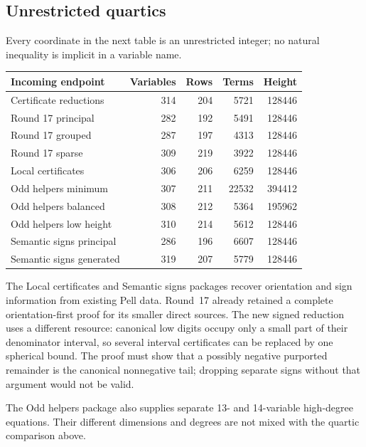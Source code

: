 \subsection{Unrestricted quartics}
Every coordinate in the next table is an unrestricted integer; no natural
inequality is implicit in a variable name.
\begin{center}\small
\begin{tabular}{@{}lrrrr@{}}\toprule
Incoming endpoint & Variables & Rows & Terms & Height\\\midrule
Certificate reductions & 314 & 204 & 5721 & 128446\\
Round 17 principal & 282 & 192 & 5491 & 128446\\
Round 17 grouped & 287 & 197 & 4313 & 128446\\
Round 17 sparse & 309 & 219 & 3922 & 128446\\
Local certificates & 306 & 206 & 6259 & 128446\\
Odd helpers minimum & 307 & 211 & 22532 & 394412\\
Odd helpers balanced & 308 & 212 & 5364 & 195962\\
Odd helpers low height & 310 & 214 & 5612 & 128446\\
Semantic signs principal & 286 & 196 & 6607 & 128446\\
Semantic signs generated & 319 & 207 & 5779 & 128446\\\bottomrule
\end{tabular}
\end{center}
The Local certificates and Semantic signs packages recover orientation and
sign information from existing Pell data. Round~17 already retained a
complete orientation-first proof for its smaller direct sources. The new
signed reduction uses a different resource: canonical low digits occupy
only a small part of their denominator interval, so several interval
certificates can be replaced by one spherical bound. The proof must show
that a possibly negative purported remainder is the canonical nonnegative
tail; dropping separate signs without that argument would not be valid.

The Odd helpers package also supplies separate 13- and 14-variable
high-degree equations. Their different dimensions and degrees are not
mixed with the quartic comparison above.

